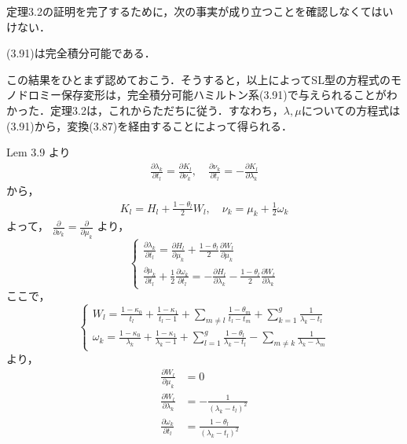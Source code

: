 

\begin{story}
定理3.2の証明を完了するために，次の事実が成り立つことを確認しなくてはいけない．

\begin{lemma}[3.12]
(3.91)は完全積分可能である．
\end{lemma}

この結果をひとまず認めておこう．そうすると，以上によってSL型の方程式のモノドロミー保存変形は，完全積分可能ハミルトン系(3.91)で与えられることがわかった．定理3.2は，これからただちに従う．すなわち，$\lambda, \mu$についての方程式は(3.91)から，変換(3.87)を経由することによって得られる．
\end{story}
Lem 3.9 より
\begin{align*}
    \frac{\partial \lambda_k}{\partial t_l} = \frac{\partial K_l}{\partial \nu_k}, \quad \frac{\partial \nu_k}{\partial t_l} = - \frac{\partial K_l}{\partial \lambda_k}
\end{align*}
から，
\begin{align*}
    K_l = H_l + \frac{1-\theta_l}{2} W_l, \quad \nu_k = \mu_k + \frac{1}{2} \omega_k
\end{align*}
よって， $\displaystyle \frac{\partial}{\partial \nu_k} = \frac{\partial}{\partial \mu_k}$ より，
\[
\begin{cases}
    \displaystyle \frac{\partial \lambda_k}{\partial t_l} = \frac{\partial H_l}{\partial \mu_k} + \frac{1-\theta_l}{2} \frac{\partial W_l}{\partial \mu_k} \\
    \displaystyle \frac{\partial \mu_k}{\partial t_l} + \frac{1}{2} \frac{\partial \omega_k}{\partial t_l} = - \frac{\partial H_l}{\partial \lambda_k} - \frac{1-\theta_l}{2} \frac{\partial W_l}{\partial \lambda_k}
\end{cases}
\]
ここで，
\[
\begin{cases}
    \displaystyle W_l = \frac{1-\kappa_0}{t_l} + \frac{1-\kappa_1}{t_l-1} + \sum_{m \neq l} \frac{1-\theta_m}{t_l-t_m} + \sum_{k=1}^g \frac{1}{\lambda_k-t_l} \\
    \displaystyle \omega_k = \frac{1-\kappa_0}{\lambda_k} + \frac{1-\kappa_1}{\lambda_k-1} + \sum_{l=1}^g \frac{1-\theta_l}{\lambda_k-t_l} - \sum_{m \neq k} \frac{1}{\lambda_k-\lambda_m}
\end{cases}
\]
より，
\begin{align*}
    \frac{\partial W_l}{\partial \mu_k} &= 0 \\
    \frac{\partial W_l}{\partial \lambda_k} &= - \frac{1}{(\lambda_k-t_l)^2} \\
    \frac{\partial \omega_k}{\partial t_l} &= \frac{1-\theta_l}{(\lambda_k-t_l)^2}
\end{align*}
